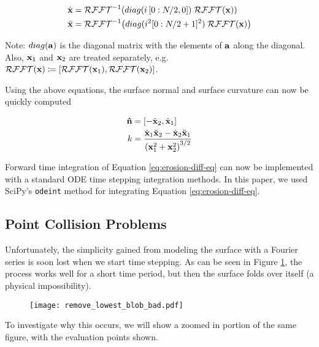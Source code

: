 \begin{align}
  \dot{\bvec{x}}& = \mathcal{RFFT}^{-1}\paren{diag(i \, [0:N/2, 0]) \; \mathcal{RFFT}(\bvec{x})}\\
  \ddot{\bvec{x}}& = \mathcal{RFFT}^{-1}\paren{diag(i^2 [0:N/2+1]^2) \; \mathcal{RFFT}(\bvec{x})}
\end{align}

Note: $diag(\mathbf{a})$ is the diagonal matrix with the elements of $\mathbf{a}$ along the diagonal. Also, $\mathbf{x}_1$ and $\mathbf{x}_2$ are treated separately, e.g.\ $\mathcal{\mathcal{RFFT}}(\mathbf{x}) \coloneqq [\mathcal{RFFT}(\mathbf{x}_1), \mathcal{RFFT}(\mathbf{x}_2)]$.

Using the above equations, the surface normal and surface curvature can now be quickly computed

\begin{align}
  \bhat{n}& = [-\dot{\bvec{x}}_2, \dot{\bvec{x}}_1]\\
  k& = \frac{\dot{\bvec{x}}_1 \ddot{\bvec{x}}_2 - \dot{\bvec{x}}_2 \ddot{\bvec{x}}_1}{\paren{\bvec{x}_1^2 + \bvec{x}_2^2}^{3/2}}
\end{align}

Forward time integration of Equation \ref{eq:erosion-diff-eq} can now be implemented with a standard ODE time stepping integration methods. In this paper, we used SciPy's {\tt odeint} method for integrating Equation \ref{eq:erosion-diff-eq}.

\subsection*{Point Collision Problems}

Unfortunately, the simplicity gained from modeling the surface with a Fourier series is soon lost when we start time stepping. As can be seen in Figure \ref{fig:remove-lowest-blob-bad}, the process works well for a short time period, but then the surface folds over itself (a physical impossibility).

\begin{figure}[H]
    \begin{center}
      \texttt{[image: remove\_lowest\_blob\_bad.pdf]}
    \end{center}
  \vspace{-.2in} %
  \caption{\label{fig:remove-lowest-blob-bad}}
\end{figure}

To investigate why this occurs, we will show a zoomed in portion of the same figure, with the evaluation points shown. 


